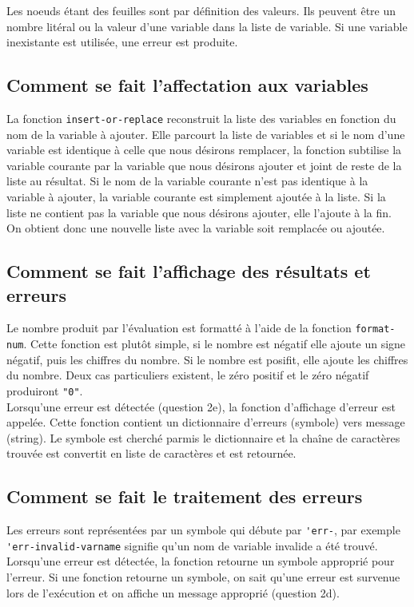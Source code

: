 \documentclass[a4paper,12pt,french]{article}
\begin{document}
        Les noeuds étant des feuilles sont par définition des valeurs. Ils peuvent être un nombre litéral ou la valeur d'une variable dans la liste de variable. Si une variable inexistante est utilisée, une erreur est produite.\\
	\subsection{Comment se fait l'affectation aux variables}
        La fonction \lstinline$insert-or-replace$ reconstruit la liste des variables en fonction du nom de la variable à ajouter. Elle parcourt la liste de variables et si le nom d'une variable est identique à celle que nous désirons remplacer, la fonction subtilise la variable courante par la variable que nous désirons ajouter et joint de reste de la liste au résultat. Si le nom de la variable courante n'est pas identique à la variable à ajouter, la variable courante est simplement ajoutée à la liste. Si la liste ne contient pas la variable que nous désirons ajouter, elle l'ajoute à la fin. On obtient donc une nouvelle liste avec la variable soit remplacée ou ajoutée.
	\subsection{Comment se fait l'affichage des résultats et erreurs}
        Le nombre produit par l'évaluation est formatté à l'aide de la fonction \lstinline$format-num$. Cette fonction est plutôt simple, si le nombre est négatif elle ajoute un signe négatif, puis les chiffres du nombre. Si le nombre est posifit, elle ajoute les chiffres du nombre. Deux cas particuliers existent, le zéro positif et le zéro négatif produiront \lstinline$"0"$.\\

        Lorsqu'une erreur est détectée (question 2e), la fonction d'affichage d'erreur est appelée. Cette fonction contient un dictionnaire d'erreurs (symbole) vers message (string). Le symbole est cherché parmis le dictionnaire et la chaîne de caractères trouvée est convertit en liste de caractères et est retournée.
	\subsection{Comment se fait le traitement des erreurs}
        Les erreurs sont représentées par un symbole qui débute par \lstinline$'err-$, par exemple \lstinline$'err-invalid-varname$ signifie qu'un nom de variable invalide a été trouvé. Lorsqu'une erreur est détectée, la fonction retourne un symbole approprié pour l'erreur. Si une fonction retourne un symbole, on sait qu'une erreur est survenue lors de l'exécution et on affiche un message approprié (question 2d).
\end{document}

